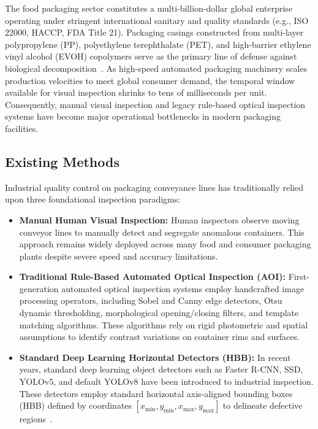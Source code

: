 The food packaging sector constitutes a multi-billion-dollar global enterprise operating under stringent international sanitary and quality standards (e.g., ISO 22000, HACCP, FDA Title 21). Packaging casings constructed from multi-layer polypropylene (PP), polyethylene terephthalate (PET), and high-barrier ethylene vinyl alcohol (EVOH) copolymers serve as the primary line of defense against biological decomposition~\cite{patel2023deep}. As high-speed automated packaging machinery scales production velocities to meet global consumer demand, the temporal window available for visual inspection shrinks to tens of milliseconds per unit. Consequently, manual visual inspection and legacy rule-based optical inspection systems have become major operational bottlenecks in modern packaging facilities.

\subsection{Existing Methods}
\label{subsec:existing}

Industrial quality control on packaging conveyance lines has traditionally relied upon three foundational inspection paradigms:

\begin{itemize}
\item \textbf{Manual Human Visual Inspection:} Human inspectors observe moving conveyor lines to manually detect and segregate anomalous containers. This approach remains widely deployed across many food and consumer packaging plants despite severe speed and accuracy limitations.
\item \textbf{Traditional Rule-Based Automated Optical Inspection (AOI):} First-generation automated optical inspection systems employ handcrafted image processing operators, including Sobel and Canny edge detectors, Otsu dynamic thresholding, morphological opening/closing filters, and template matching algorithms. These algorithms rely on rigid photometric and spatial assumptions to identify contrast variations on container rims and surfaces.
\item \textbf{Standard Deep Learning Horizontal Detectors (HBB):} In recent years, standard deep learning object detectors such as Faster R-CNN, SSD, YOLOv5, and default YOLOv8 have been introduced to industrial inspection. These detectors employ standard horizontal axis-aligned bounding boxes (HBB) defined by coordinates $[x_{\min}, y_{\min}, x_{\max}, y_{\max}]$ to delineate defective regions~\cite{terven2023yolo,gupta2024benchmark}.
\end{itemize}

